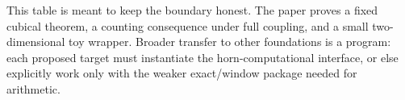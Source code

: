 This table is meant to keep the boundary honest.  The paper proves a fixed cubical theorem, a
counting consequence under full coupling, and a small two-dimensional toy wrapper.  Broader
transfer to other foundations is a program: each proposed target must instantiate the
horn-computational interface, or else explicitly work only with the weaker exact/window
package needed for arithmetic.
